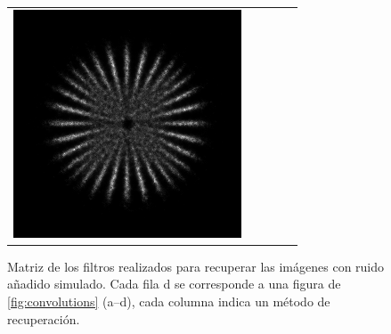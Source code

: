 \documentclass{./packages/optica-article}
\begin{document}
\begin{figure}[hbp]
\begin{tabular}[t]{l c c c c}
		\includegraphics[scale=0.25]{Simulation deconvolution/ref_np_0.01/RL_50.png}
		\\
	\end{tabular}
	\caption{Matriz de los filtros realizados para recuperar las imágenes con ruido añadido simulado. Cada fila d se corresponde a una figura de \ref{fig:convolutions} (a--d), cada columna indica un método de recuperación.}
\end{figure}
\end{document}
